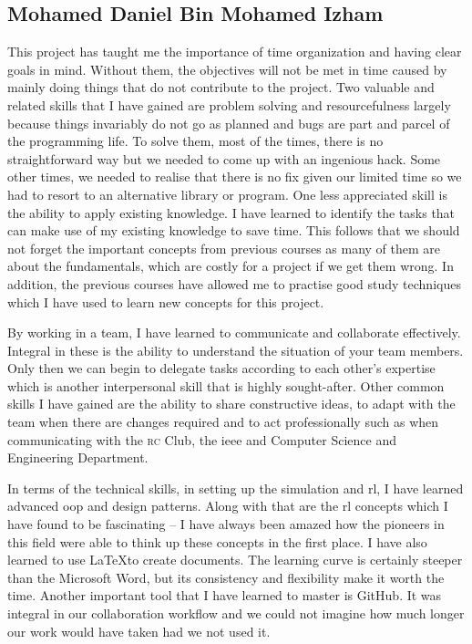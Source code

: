 \documentclass[../main.tex]{subfiles}
\begin{document}
\subsection{Mohamed Daniel Bin Mohamed Izham}

This project has taught me the importance of time organization and
having clear goals in mind.
Without them, the objectives will not be met in time caused by mainly
doing things that do not contribute to the project.
Two valuable and related skills that I have gained are problem solving
and resourcefulness largely because things invariably do not go as
planned and bugs are part and parcel of the programming life. 
To solve them, most of the times, there is no straightforward way but
we needed to come up with an ingenious hack.
Some other times, we needed to realise that there is no fix given our
limited time so we had to resort to an alternative library or program.
One less appreciated skill is the ability to apply existing knowledge. 
I have learned to identify the tasks that can make use of my
existing knowledge to save time.
This follows that we should not forget the important concepts from
previous courses as many of them are about the fundamentals, which are
costly for a project if we get them wrong.
In addition, the previous courses have allowed me to practise good
study techniques which I have used to learn new concepts for this
project.

By working in a team, I have learned to communicate and collaborate
effectively.
Integral in these is the ability to understand the situation of your
team members.
Only then we can begin to delegate tasks according to each other's
expertise which is another interpersonal skill that is highly
sought-after.
Other common skills I have gained are the ability to share
constructive ideas, to adapt with the team when there are changes
required and to act professionally such as when communicating with the
\textsc{rc} Club, the \gls{ieee} and Computer Science and Engineering
Department.

In terms of the technical skills, in setting up the simulation and
\gls{rl}, I have learned advanced \gls{oop} and design patterns.  
Along with that are the \gls{rl} concepts which I have found to be
fascinating -- I have always been amazed how the pioneers in this
field were able to think up these concepts in the first place.
I have also learned to use \LaTeX to create documents.
The learning curve is certainly steeper than the Microsoft Word, but
its consistency and flexibility make it worth the time.
Another important tool that I have learned to master is GitHub.
It was integral in our collaboration workflow and we could not imagine
how much longer our work would have taken had we not used it.
\end{document}
